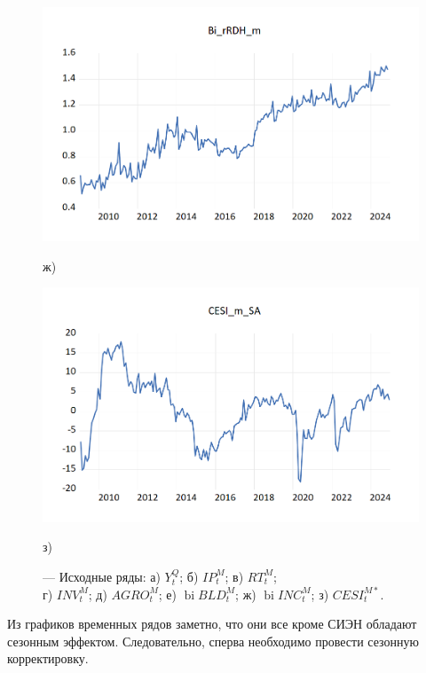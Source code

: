 \documentclass[a4paper, 14pt]{extreport}
\numberwithin{equation}{section}
\newcommand{\bi}{\operatorname{bi}}
\numberwithin{equation}{section}
\begin{document}
\begin{figure}[h!]
		\begin{minipage}{0.5\textwidth}
			\centering
			\includegraphics[scale=0.4]{images/image12}
			\caption*{ж)}
		\end{minipage}%
		\hfill %
		\begin{minipage}{0.5\textwidth}
			\centering
			\includegraphics[scale=0.4]{images/image14}
			\caption*{з)}
		\end{minipage}
	
		\caption{\centering --- Исходные ряды: а) {$Y_t^Q$}; б) {$IP_t^M$}; в) {$RT_t^M$};\\ г) {$INV_t^M$}; д) {$AGRO_t^M$}; е) {$\bi BLD_t^M$}; ж) $\bi INC_t^M$; з) $CESI^{M*}_t$.}
		\label{fig:ts-1}
	\end{figure}
	
	Из графиков временных рядов заметно, что они все кроме СИЭН обладают сезонным эффектом. Следовательно, сперва необходимо провести сезонную корректировку.
	
\end{document}
